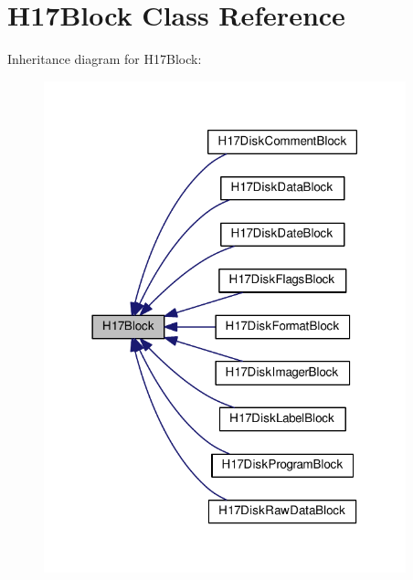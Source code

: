 \hypertarget{classH17Block}{}\section{H17\+Block Class Reference}
\label{classH17Block}


Inheritance diagram for H17\+Block\+:
\nopagebreak
\begin{figure}[H]
\begin{center}
\leavevmode
\includegraphics[width=297pt]{classH17Block__inherit__graph}
\end{center}
\end{figure}
